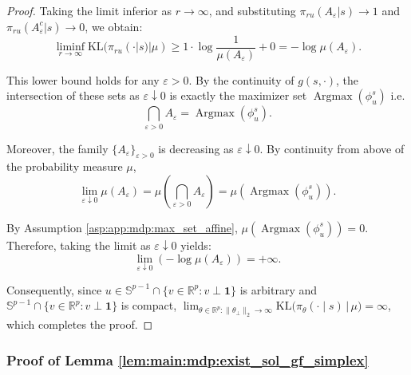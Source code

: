 \documentclass{amsart}
\theoremstyle{definition}
\begin{document}
\begin{proof}
Taking the limit inferior as $r \to \infty$, and substituting $\pi_{ru}(A_\varepsilon | s) \to 1$ and $\pi_{ru}(A_\varepsilon^c | s) \to 0$, we obtain:
\[
\liminf_{r \to \infty} \mathrm{KL}(\pi_{ru}(\cdot |s) | \mu) \ge 1 \cdot \log \frac{1}{\mu(A_\varepsilon)} + 0 = -\log \mu(A_\varepsilon).
\]

This lower bound holds for any $\varepsilon > 0$. By the continuity of $g(s,\cdot)$, the intersection of these sets as $\varepsilon \downarrow 0$ is exactly the maximizer set $\operatorname{Argmax}(\phi^s_u)$ i.e.
\[
\bigcap_{\varepsilon > 0} A_\varepsilon
=
\operatorname{Argmax}(\phi^s_u).
\]

Moreover, the family $\{A_\varepsilon\}_{\varepsilon > 0}$ is decreasing as
$\varepsilon \downarrow 0$.
By continuity from above of the probability measure $\mu$,
\[
\lim_{\varepsilon \downarrow 0} \mu(A_\varepsilon)
=
\mu\!\left( \bigcap_{\varepsilon > 0} A_\varepsilon \right)
=
\mu(\operatorname{Argmax}(\phi^s_u)).
\]

By Assumption \ref{asp:app:mdp:max_set_affine}, $\mu(\operatorname{Argmax}(\phi^s_u)) = 0$. Therefore, taking the limit as $\varepsilon \downarrow 0$ yields:
\[
\lim_{\varepsilon \downarrow 0} (-\log \mu(A_\varepsilon)) = +\infty.
\]

Consequently, since $u \in \mathbb{S}^{p-1} \cap \{v \in \mathbb{R}^p: v \perp \mathbf 1\}$ is arbitrary and $\mathbb{S}^{p-1} \cap \{v \in \mathbb{R}^p: v \perp \mathbf 1\}$ is compact, $\lim_{\theta\in \mathbb R^p:\|\theta_\perp\|_2\to\infty}
\mathrm{KL}\bigl(\pi_\theta(\cdot\mid s)\,|\,\mu\bigr)=\infty$, which completes the proof.
\end{proof}

\subsubsection{Proof of Lemma \ref{lem:main:mdp:exist_sol_gf_simplex}}
\label{sec:pf_exist_sol_gf_simplex}

\ExistSolSimplex*
\end{document}
